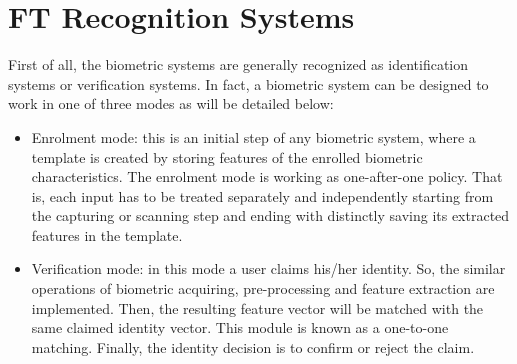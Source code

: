 \documentclass[review]{elsarticle}
\begin{document}
\section{FT Recognition Systems}
	First of all, the biometric systems are generally recognized as identification systems or verification systems. In fact, a biometric system can be designed to work in one of three modes as will be detailed below:
	\begin{itemize}
		\item Enrolment mode: this is an initial step of any biometric system, where a template is created by storing features of the enrolled biometric characteristics. The enrolment mode is working as one-after-one policy. That is, each input has to be treated separately and independently starting from the capturing or scanning step and ending with distinctly saving its extracted features in the template. 
		\item Verification mode: in this mode a user claims his/her identity. So, the similar operations of biometric acquiring, pre-processing and feature extraction are implemented. Then, the resulting feature vector will be matched with the same claimed identity vector. This module is known as a one-to-one matching. Finally, the identity decision is to confirm or reject the claim. 

\end{itemize}
\end{document}
